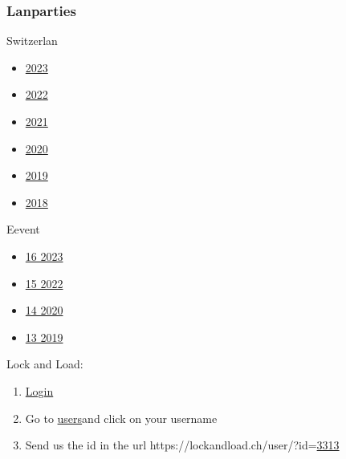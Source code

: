 \documentclass{article}
\begin{document}
\subsubsection{Lanparties}
Switzerlan
\begin{itemize}
    \item \href{https://battlefy.com/switzerlan-2023/switzerlan-2023-counter-strike-2/65293e1a490b280d6f6adcb0/participants}{2023}
    \item \href{https://battlefy.com/switzerlan-2022/switzerlan-2022-csgo/634937c11ecc2379690e86f8/participants}{2022}
    \item \href{https://battlefy.com/switzerlan-2021/switzerlan-2021-csgo/613e02153a882b30a4149fc3/participants}{2021}
    \item \href{https://battlefy.com/switzerlan-2020/switzerlan-2020-csgo/5f806e118f28e0606c16e93a/participants}{2020}
    \item \href{https://battlefy.com/switzerlan-2019/csgo-5on5-main-tournament/5dd7f3c10f8e011abc0fd63f/participants}{2019}
    \item \href{https://battlefy.com/switzerlan-2018/csgo-5on5-main-tournament/5bb561bd0983dd03b26db586/participants}{2018}
\end{itemize}
Eevent
\begin{itemize}
    \item \href{https://16.eevent.ch/turnier/?do=teilnehmer&id=268}{16 2023}
    \item \href{https://15.eevent.ch/turnier/?do=teilnehmer&id=244}{15 2022}
    \item \href{https://14.eevent.ch/turnier/?do=teilnehmer&id=188}{14 2020}
    \item \href{https://13.eevent.ch/turnier/?do=teilnehmer&id=149}{13 2019}
\end{itemize}
Lock and Load:
\begin{enumerate}
 \item \href{https://lockandload.ch/user/?do=login}{Login}
 \item Go to \href{https://lockandload.ch/online/}{users}and click on your username
 \item Send us the id in the url https://lockandload.ch/user/?id=\underline{3313}
\end{enumerate}
\end{document}
